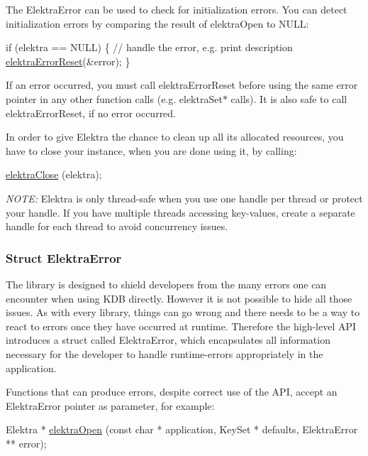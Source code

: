 The {\ttfamily Elektra\+Error} can be used to check for initialization errors. You can detect initialization errors by comparing the result of {\ttfamily elektra\+Open} to N\+U\+LL\+:


\begin{DoxyCode}
\textcolor{keywordflow}{if} (elektra == NULL)
\{
  \textcolor{comment}{// handle the error, e.g. print description}
  \hyperlink{group__highlevel_ga591f7ed4b57a341928bf7bb3d7adb693}{elektraErrorReset}(&error);
\}
\end{DoxyCode}


If an error occurred, you must call {\ttfamily elektra\+Error\+Reset} before using the same error pointer in any other function calls (e.\+g. {\ttfamily elektra\+Set$\ast$} calls). It is also safe to call {\ttfamily elektra\+Error\+Reset}, if no error occurred.

In order to give Elektra the chance to clean up all its allocated resources, you have to close your instance, when you are done using it, by calling\+:


\begin{DoxyCode}
\hyperlink{group__highlevel_ga9b688b7250e5f9d8ea6701cc2cc269af}{elektraClose} (elektra);
\end{DoxyCode}


{\itshape N\+O\+TE\+:} Elektra is only thread-\/safe when you use one handle per thread or protect your handle. If you have multiple threads accessing key-\/values, create a separate handle for each thread to avoid concurrency issues.

\subsubsection*{Struct {\ttfamily Elektra\+Error}}

The library is designed to shield developers from the many errors one can encounter when using K\+DB directly. However it is not possible to hide all those issues. As with every library, things can go wrong and there needs to be a way to react to errors once they have occurred at runtime. Therefore the high-\/level A\+PI introduces a struct called {\ttfamily Elektra\+Error}, which encapsulates all information necessary for the developer to handle runtime-\/errors appropriately in the application.

Functions that can produce errors, despite correct use of the A\+PI, accept an {\ttfamily Elektra\+Error} pointer as parameter, for example\+:


\begin{DoxyCode}
Elektra * \hyperlink{group__highlevel_ga267ac9c5ac023d28d4df306933ff5a7b}{elektraOpen} (\textcolor{keyword}{const} \textcolor{keywordtype}{char} * application, KeySet * defaults, ElektraError ** error);
\end{DoxyCode}


